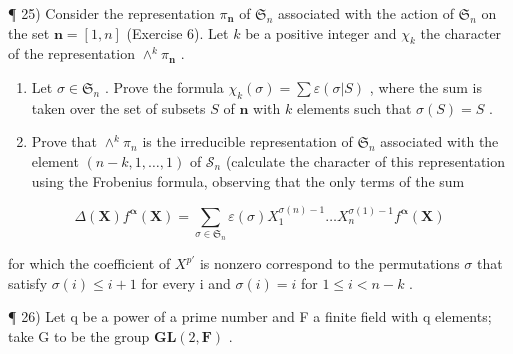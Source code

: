 ¶ 25) Consider the representation \(\pi_{\mathbf{n}}\) of \(\mathfrak{S}_n\) associated with the action of \(\mathfrak{S}_n\) on the set \(\mathbf{n} = [1, n]\) (Exercise 6). Let \(k\) be a positive integer and \(\chi_k\) the character of the representation \(\wedge^k \pi_{\mathbf{n}}\) .

\begin{enumerate}
\def\labelenumi{\alph{enumi})}
\item
  Let \(\sigma \in \mathfrak{S}_n\) . Prove the formula \(\chi_k(\sigma) = \sum \varepsilon (\sigma |S)\) , where the sum is taken over the set of subsets \(S\) of \(\mathbf{n}\) with \(k\) elements such that \(\sigma (S) = S\) .
\item
  Prove that \(\wedge^{k}\pi_{n}\) is the irreducible representation of \(\mathfrak{S}_n\) associated with the element \((n-k,1,\ldots,1)\) of \(\mathcal{S}_n\) (calculate the character of this representation using the Frobenius formula, observing that the only terms of the sum
\end{enumerate}

\[
\Delta (\mathbf {X}) f ^ {\boldsymbol {\alpha}} (\mathbf {X}) = \sum_ {\sigma \in \mathfrak {S} _ {n}} \varepsilon (\sigma) X _ {1} ^ {\sigma (n) - 1} \dots X _ {n} ^ {\sigma (1) - 1} f ^ {\boldsymbol {\alpha}} (\mathbf {X})
\]

for which the coefficient of \(X^{p'}\) is nonzero correspond to the permutations \(\sigma\) that satisfy \(\sigma(i) \leqslant i + 1\) for every i and \(\sigma(i) = i\) for \(1 \leqslant i < n - k\) .

¶ 26) Let q be a power of a prime number and F a finite field with q elements; take G to be the group \(\mathbf{GL}(2, \mathbf{F})\) .

